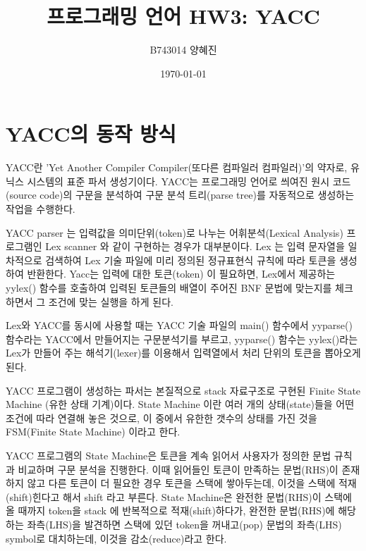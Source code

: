 \documentclass{article}
\begin{document}
\title{프로그래밍 언어 HW3: YACC}
\author{B743014 양혜진}
\date{\today}
\maketitle

\section{YACC의 동작 방식}
YACC란 'Yet Another Compiler Compiler(또다른 컴파일러 컴파일러)'의 약자로, 
유닉스 시스템의 표준 파서 생성기이다. YACC는 프로그래밍 언어로 씌여진 원시 코드(source code)의
구문을 분석하여 구문 분석 트리(parse tree)를 자동적으로 생성하는 작업을 수행한다.

\vspace{3mm}
\noindent
YACC parser 는 입력값을 의미단위(token)로 나누는 어휘분석(Lexical Analysis) 프로그램인
Lex scanner 와 같이 구현하는 경우가 대부분이다. Lex 는 입력 문자열을 일차적으로 검색하여
Lex 기술 파일에 미리 정의된 정규표현식 규칙에 따라 토큰을 생성하여 반환한다. Yacc는 입력에 대한 토큰(token)
이 필요하면, Lex에서 제공하는 yylex() 함수를 호출하여 입력된 토큰들의 배열이 주어진 BNF 문법에 맞는지를
체크하면서 그 조건에 맞는 실행을 하게 된다.

\vspace{3mm}
\noindent
Lex와 YACC를 동시에 사용할 때는 YACC 기술 파일의 main() 함수에서 yyparse() 함수라는 YACC에서
만들어지는 구문분석기를 부르고, yyparse() 함수는 yylex()라는 Lex가 만들어 주는 해석기(lexer)를
이용해서 입력열에서 처리 단위의 토큰을 뽑아오게 된다.

\vspace{3mm}
\noindent
YACC 프로그램이 생성하는 파서는 본질적으로 stack 자료구조로 구현된 Finite State Machine
(유한 상태 기계)이다. State Machine 이란 여러 개의 상태(state)들을 어떤 조건에 따라 연결해
놓은 것으로, 이 중에서 유한한 갯수의 상태를 가진 것을 FSM(Finite State Machine) 이라고 한다.

\vspace{3mm}
\noindent
YACC 프로그램의 State Machine은 토큰을 계속 읽어서 사용자가 정의한 문법 규칙과 비교하며
구문 분석을 진행한다. 이때 읽어들인 토큰이 만족하는 문법(RHS)이 존재하지 않고 다른 토큰이 더 필요한 경우
토큰을 스택에 쌓아두는데, 이것을 스택에 적재(shift)힌다고 해서 shift 라고 부른다.
State Machine은 완전한 문법(RHS)이 스택에 올 때까지 token을 stack 에 반복적으로
적재(shift)하다가, 완전한 문법(RHS)에 해당하는 좌측(LHS)을 발견하면
스택에 있던 token을 꺼내고(pop) 문법의 좌측(LHS) symbol로 대치하는데,
이것을 감소(reduce)라고 한다.
\end{document}
